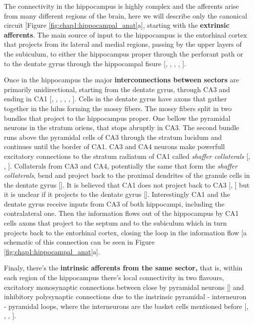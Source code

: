 The connectivity in the hippocampus is highly complex and the afferents arise from many different regions of the brain, here we will describe only the canonical circuit [Figure \ref{fig:chap1:hippocampal_anat}a], starting with the \textbf{extrinsic afferents}. 
The main source of input to the hippocampus is the entorhinal cortex that projects from its lateral and medial regions, passing by the upper layers of the subiculum, to either the hippocampus proper through the perforant path or to the dentate gyrus through the hippocampal fisure [\cite{nafstad1967}, \cite{hjorth1972}, \cite{vanhoesen1972}, \cite{hjorth1973}, \cite{vanhoesen1975b}].

Once in the hippocampus the major \textbf{interconnections between sectors} are primarily unidirectional, starting from the dentate gyrus, through CA3 and ending in CA1 [\cite{lorente1934}, \cite{raisman1965}, \cite{hjorth1973}, \cite{andersen1966}, \cite{fujita1962}, \cite{gloorverasperti1963}].   
Cells in the dentate gyrus have axons that gather together in the hilus forming the mossy fibers. The mossy fibers split in two bundles that project to the hippocampus proper. 
One bellow the pyramidal neurons in the stratum oriens, that stops abruptly in CA3.
The second bundle runs above the pyramidal cells of CA3 through the stratum lucidum and continues until the border of CA1.
CA3 and CA4 neurons make powerfull excitatory connections to the stratum radiatum of CA1 called \textit{shaffer collaterals} [\cite{lorente1934}, \cite{hjorth1973}, \cite{andersen1966}]. 
Collaterals from CA3 and CA4, potentially the same that form the \textit{shaffer collaterals}, bend and project back to the proximal dendrites of the granule cells in the dentate gyrus [\cite{zimmer1971}].
It is believed that CA1 does not project back to CA3 [\cite{raisman1966}, \cite{hjorth1973}] but it is unclear if it projects to the dentate gyrus [\cite{hjorth1973}].
Interestingly CA1 and the dentate gyrus receive inputs from CA3 of both hippocampi, including the contralateral one.
Then the information flows out of the hippocampus by CA1 cells axons that project to the septum and to the subiculum which in turn projects back to the entorhinal cortex, closing the loop in the information flow [a schematic of this connection can be seen in Figure \ref{fig:chap1:hippocampal_anat}a].

Finaly, there's the \textbf{intrinsic afferents from the same sector,} that is, within each region of the hippocampus there's local connectivity in two flavours, excitatory monosynaptic connections between close by pyramidal neurons [\cite{lebovitz1971}] and inhibitory polysynaptic connections due to the instrinsic pyramidal - interneuron - pyramidal loops, where the interneurons are the basket cells mentioned before [\cite{kandel1961}, \cite{spencerkandel1961c}, \cite{andersen1964a}, \cite{andersen1964b}].

